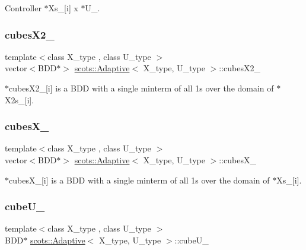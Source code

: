 Controller  $\ast$\+Xs\+\_\+\mbox{[}i\mbox{]} x $\ast$\+U\+\_\+. \mbox{\label{classscots_1_1Adaptive_a6fa7b7542b91ec37ff2358359e425d12}} 
\subsubsection{\texorpdfstring{cubes\+X2\+\_\+}{cubesX2\_}}
{\footnotesize\ttfamily template$<$class X\+\_\+type , class U\+\_\+type $>$ \\
vector$<$B\+DD$\ast$$>$ \hyperlink{classscots_1_1Adaptive}{scots\+::\+Adaptive}$<$ X\+\_\+type, U\+\_\+type $>$\+::cubes\+X2\+\_\+}

$\ast$cubes\+X2\+\_\+\mbox{[}i\mbox{]} is a B\+DD with a single minterm of all 1s over the domain of $\ast$\+X2s\+\_\+\mbox{[}i\mbox{]}. \mbox{\label{classscots_1_1Adaptive_ac82296bd0392bccf2a0e4af9ba70ff37}} 
\subsubsection{\texorpdfstring{cubes\+X\+\_\+}{cubesX\_}}
{\footnotesize\ttfamily template$<$class X\+\_\+type , class U\+\_\+type $>$ \\
vector$<$B\+DD$\ast$$>$ \hyperlink{classscots_1_1Adaptive}{scots\+::\+Adaptive}$<$ X\+\_\+type, U\+\_\+type $>$\+::cubes\+X\+\_\+}

$\ast$cubes\+X\+\_\+\mbox{[}i\mbox{]} is a B\+DD with a single minterm of all 1s over the domain of $\ast$\+Xs\+\_\+\mbox{[}i\mbox{]}. \mbox{\label{classscots_1_1Adaptive_a0332230a9bad14d432e6651611863be9}} 
\subsubsection{\texorpdfstring{cube\+U\+\_\+}{cubeU\_}}
{\footnotesize\ttfamily template$<$class X\+\_\+type , class U\+\_\+type $>$ \\
B\+DD$\ast$ \hyperlink{classscots_1_1Adaptive}{scots\+::\+Adaptive}$<$ X\+\_\+type, U\+\_\+type $>$\+::cube\+U\+\_\+}

